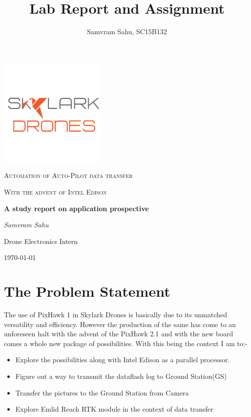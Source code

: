 \documentclass[12pt]{report}
\title{Lab Report and Assignment}
\author{Samvram Sahu, SC15B132}
\begin{document}
\begin{titlepage}
	\centering
	\includegraphics[width=0.5\linewidth]{skylark.png}\par\vspace{1cm}
	{\scshape\LARGE Automation of Auto-Pilot data transfer \par}
	\vspace{1cm}
	{\scshape\Large With the advent of Intel Edison  \par}
	\vspace{1.5cm}
	{\huge\bfseries A study report on application prospective \par}
	\vspace{1cm}
	{\Large\itshape Samvram Sahu\par}
	Drone Electronics Intern\\
	{\large \today\par}
\end{titlepage}

\tableofcontents

\chapter{The Problem Statement}
The use of PixHawk 1 in Skylark Drones is basically due to its unmatched versatility and efficiency. However the production of the same has come to an unforeseen halt with the advent of the PixHawk 2.1 and with the new board comes a whole new package of possibilities. With this being the context I am to:-
\begin{itemize}
 \item{Explore the possibilities along with Intel Edison as a parallel processor.}
 \item{Figure out a way to transmit the dataflash log to Ground Station(GS)}
 \item{Transfer the pictures to the Ground Station from Camera}
 \item{Explore Emlid Reach RTK module in the context of data transfer}
\end{itemize}
\vspace{6cm}
\end{document}
